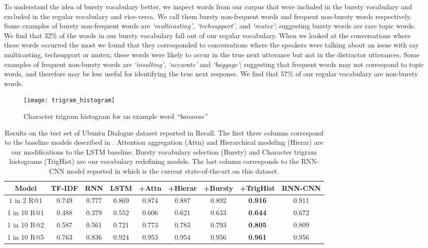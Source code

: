 \documentclass[11pt]{report}
\renewcommand\cite{\citep}	%
\begin{document}
To understand the idea of bursty vocabulary better, we inspect words from our corpus that were included in the bursty vocabulary and excluded in the regular vocabulary and vice-versa. We call them bursty non-frequent words and frequent non-bursty words respectively. Some examples of bursty non-frequent words are \textit{`multicasting', `techsupport',} and  \textit{`mutex'}; suggesting bursty words are rare topic words. We find that 32\% of the words in our bursty vocabulary fall out of our regular vocabulary.
When we looked at the conversations where these words occurred the most we found that they corresponded to conversations where the speakers were talking about an issue with say multicasting, techsupport or mutex; these words were likely to occur in the true next utterance but not in the distractor utterances.
Some examples of frequent non-bursty words are \textit{`insulting', `accurate'} and \textit{`baggage'}; suggesting that frequent words may not correspond to topic words, and therefore may be less useful for identifying the true next response. We find that 57\% of our regular vocabulary are non-bursty words.

\begin{figure}
\texttt{[image: trigram\_histogram]}
\caption{Character trigram histogram for an example word \textit{``bananas''}}
\label{fig:trigram_histogram}
\vspace{-1.0em}
\end{figure}

\begin{table}
\begin{tabular}{  c | c | c | c | c | c | c | c | c }
Model & TF-IDF & RNN & LSTM & +Attn & +Hierar & +Bursty & +TrigHist & RNN-CNN \\ \hline
1 in 2 R@1 & 0.749 & 0.777 & 0.869 & 0.874 & 0.887 & 0.892 & \textbf{0.916} & 0.911\\ 
1 in 10 R@1 & 0.488 & 0.379 & 0.552 & 0.606 & 0.621 & 0.633 & \textbf{0.644} & 0.672\\
1 in 10 R@2 & 0.587 & 0.561 & 0.721 & 0.773 & 0.783 & 0.793 & \textbf{0.805} & 0.809\\ 
1 in 10 R@5 & 0.763 & 0.836 & 0.924 & 0.953 & 0.954 & 0.956 & \textbf{0.961} & 0.956 \\ \hline
\end{tabular}
\caption{Results on the test set of Ubuntu Dialogue dataset reported in Recall. The first three columns correspond to the baseline models described in \cite{lowe2015ubuntu}. Attention aggregation (Attn) and Hierarchical modeling (Hierar) are our modifications to the LSTM baseline. Bursty vocabulary selection (Bursty) and Character trigram histograms (TrigHist) are our vocabulary redefining models. The last column corresponds to the RNN-CNN model reported in \cite{baudivs2016sentence} which is the current state-of-the-art on this dataset.}
\label{results}
\end{table}
\end{document}
